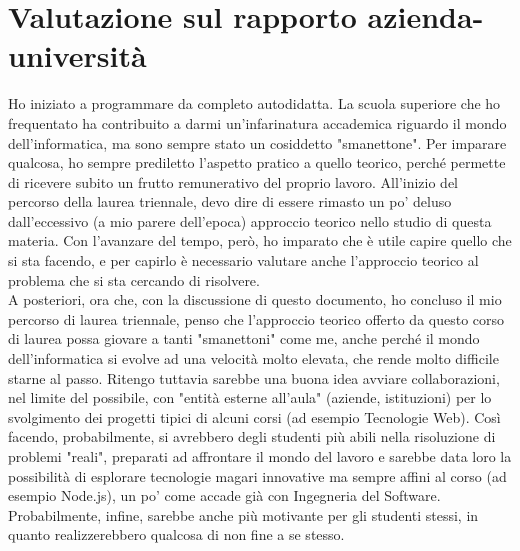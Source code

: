 \section{Valutazione sul rapporto azienda-università}
Ho iniziato a programmare da completo autodidatta. La scuola superiore che ho frequentato ha contribuito a darmi un'infarinatura accademica riguardo il mondo dell'informatica, ma sono sempre stato un cosiddetto "smanettone". Per imparare qualcosa, ho sempre prediletto l'aspetto pratico a quello teorico, perché permette di ricevere subito un frutto remunerativo del proprio lavoro. All'inizio del percorso della laurea triennale, devo dire di essere rimasto un po' deluso dall'eccessivo (a mio parere dell'epoca) approccio teorico nello studio di questa materia. Con l'avanzare del tempo, però, ho imparato che è utile capire quello che si sta facendo, e per capirlo è necessario valutare anche l'approccio teorico al problema che si sta cercando di risolvere.\\
A posteriori, ora che, con la discussione di questo documento, ho concluso il mio percorso di laurea triennale, penso che l'approccio teorico offerto da questo corso di laurea possa giovare a tanti "smanettoni" come me, anche perché il mondo dell'informatica si evolve ad una velocità molto elevata, che rende molto difficile starne al passo. Ritengo tuttavia sarebbe una buona idea avviare collaborazioni, nel limite del possibile, con "entità esterne all'aula" (aziende, istituzioni) per lo svolgimento dei progetti tipici di alcuni corsi (ad esempio Tecnologie Web). Così facendo, probabilmente, si avrebbero degli studenti più abili nella risoluzione di problemi "reali", preparati ad affrontare il mondo del lavoro e sarebbe data loro la possibilità di esplorare tecnologie magari innovative ma sempre affini al corso (ad esempio Node.js), un po' come accade già con Ingegneria del Software. Probabilmente, infine, sarebbe anche più motivante per gli studenti stessi, in quanto realizzerebbero qualcosa di non fine a se stesso.